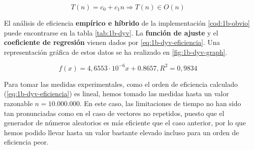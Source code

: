 \begin{equation}
    T(n) = c_0 + c_1 n \Rightarrow \boxed{T(n) \in O(n)}
\end{equation}

El análisis de eficiencia \textbf{empírico e híbrido}
de la implementación \ref{cod:1b-obvio} puede encontrarse en la tabla \ref{tab:1b-dyv}. La 
\textbf{función de ajuste} y el \textbf{coeficiente de regresión} vienen dados 
por \ref{eq:1b-dyv-eficiencia}. Una representación gráfica de estos datos se ha realizado en
\ref{fig:1b-dyv-graph}. 

\begin{equation}
    \boxed{f(x) = 4,6553 \cdot 10^{-6} x + 0.8657, R^2 = 0,9834}
    \label{eq:1b-dyv-eficiencia}
\end{equation}

Para tomar las medidas experimentales, como el orden de eficiencia calculado 
(\ref{eq:1b-dyv-eficiencia}) es lineal, hemos tomado las medidas hasta 
un valor razonable $n=10.000.000$. En este caso, las limitaciones de tiempo
no han sido tan pronunciadas como en el caso de vectores no repetidos,
puesto que el generador de números aleatorios es más eficiente que el caso
anterior, por lo que hemos podido llevar hasta un valor bastante elevado 
incluso para un orden de eficiencia peor. 

